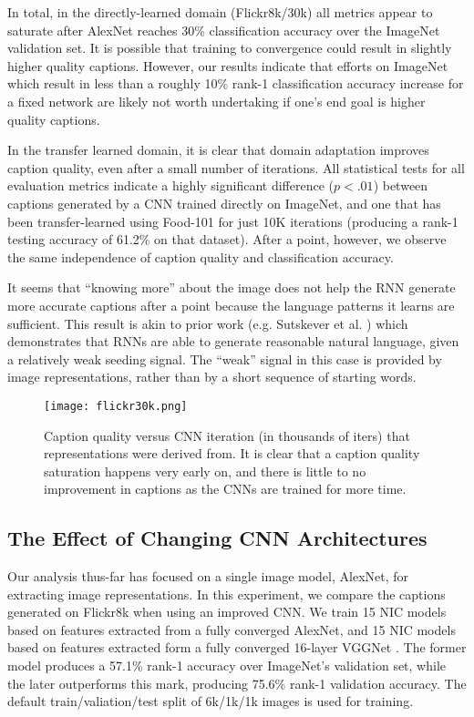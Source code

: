 \documentclass[11pt]{article}
\begin{document}
In total, in the directly-learned domain (Flickr8k/30k) all metrics
appear to saturate after AlexNet reaches 30\% classification accuracy
over the ImageNet validation set. It is possible that training to
convergence could result in slightly higher quality captions. However,
our results indicate that efforts on ImageNet which result in less
than a roughly 10\% rank-1 classification accuracy increase for a
fixed network are likely not worth undertaking if one's end goal is
higher quality captions.

In the transfer learned domain, it is clear that domain adaptation
improves caption quality, even after a small number of iterations.
All statistical tests for all evaluation metrics indicate a highly
significant difference ($p < .01$) between captions generated by a CNN
trained directly on ImageNet, and one that has been transfer-learned
using Food-101 for just 10K iterations (producing a rank-1 testing
accuracy of 61.2\% on that dataset). After a point, however, we
observe the same independence of caption quality and classification
accuracy.

It seems that ``knowing more'' about the image does not help the RNN
generate more accurate captions after a point because the language
patterns it learns are sufficient. This result is akin to prior work
(e.g. Sutskever et al. ) which
demonstrates that RNNs are able to generate reasonable natural
language, given a relatively weak seeding signal. The ``weak'' signal
in this case is provided by image representations, rather than by a
short sequence of starting words.

\begin{figure}
\centering
\texttt{[image: flickr30k.png]}
\caption{Caption quality versus CNN iteration (in thousands of iters)
  that representations were derived from. It is clear that a caption
  quality saturation happens very early on, and there is little to no
  improvement in captions as the CNNs are trained for more time.}
\label{fig:f30k}
\end{figure}

\subsection{The Effect of Changing CNN Architectures}
Our analysis thus-far has focused on a single image model, AlexNet, for
extracting image representations. In this experiment, we compare the
captions generated on Flickr8k when using an improved CNN. We train 15
NIC models based on features extracted from a fully converged AlexNet,
and 15 NIC models based on features extracted form a fully converged
16-layer VGGNet \cite{simonyan2014very}. The former model produces a
57.1\% rank-1 accuracy over ImageNet's validation set, while the later
outperforms this mark, producing 75.6\% rank-1 validation accuracy. The
default train/valiation/test split of 6k/1k/1k images is used for
training.
\end{document}
